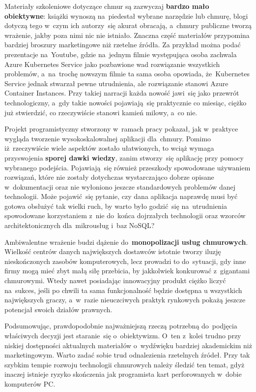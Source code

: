 \documentclass[12pt,a4paper,twoside,titlepage,openright]{book}
\begin{document}
Materiały szkoleniowe dotyczące chmur są zazwyczaj \textbf{bardzo mało obiektywne}: książki wynoszą na~piedestał wybrane narzędzie lub chmurę, blogi dotyczą tego w~czym ich autorzy~się akurat obracają, a~chmury publiczne tworzą wrażenie, jakby poza nimi nic nie istniało. Znaczna część materiałów przypomina bardziej broszury marketingowe niż rzetelne źródła. Za przykład można podać prezentacje na~Youtube, gdzie na~jednym filmie występująca osoba zachwala Azure Kubernetes Service jako pozbawione wad rozwiązanie wszystkich problemów, a~na~trochę nowszym filmie ta sama osoba opowiada, że~Kubernetes Service jednak stwarzał pewne utrudnienia, ale rozwiązanie stanowi Azure Container Instances. Przy takiej narracji każda nowość jawi~się jako przewrót technologiczny, a~gdy takie nowości pojawiają~się praktycznie co miesiąc, ciężko już stwierdzić, co rzeczywiście stanowi kamień milowy, a~co nie.

Projekt programistyczny stworzony w~ramach pracy pokazał, jak w~praktyce wygląda tworzenie wysokoskalowalnej aplikacji dla~chmury. Pomimo iż~rzeczywiście wiele aspektów zostało ułatwionych, to wciąż wymaga przyswojenia \textbf{sporej dawki wiedzy}, zanim stworzy~się aplikację przy pomocy wybranego podejścia. Pojawiają~się również przeszkody spowodowane używaniem rozwiązań, które nie zostały dotychczas wystarczająco dobrze opisane w~dokumentacji oraz nie wyłoniono jeszcze standardowych problemów danej technologii. Może pojawić~się pytanie, czy dana aplikacja naprawdę musi być gotowa obsłużyć tak wielki ruch, by warto było godzić~się na~utrudnienia spowodowane korzystaniem z~nie do~końca dojrzałych technologii oraz wzorców architektonicznych dla~mikrousług i~baz NoSQL? 

Ambiwalentne wrażenie budzi dążenie do~\textbf{monopolizacji usług chmurowych}. Wielkość centrów danych największych dostawców istotnie tworzy iluzję nieskończonych zasobów komputerowych, lecz prowadzi to do~sytuacji, gdy inne firmy mogą mieć zbyt małą siłę przebicia, by jakkolwiek konkurować z~gigantami chmurowymi. Wtedy nawet posiadając innowacyjny produkt ciężko liczyć na~sukces, jeśli po chwili ta sama funkcjonalność będzie dostępna u wszystkich największych graczy, a~w~razie nieuczciwych praktyk rynkowych pokażą jeszcze potencjał swoich działów prawnych.

Podsumowując, prawdopodobnie najważniejszą rzeczą potrzebną do~podjęcia właściwych decyzji jest staranie~się o~obiektywizm. O~ten z~kolei trudno przy niskiej dostępności aktualnych materiałów o~wydźwięku bardziej akademickim niż marketingowym. Warto zadać sobie trud odnalezienia rzetelnych źródeł. Przy tak szybkim tempie rozwoju technologii chmurowych należy śledzić ten temat, gdyż inaczej istnieje ryzyko skończenia jak programista kart perforowanych w~dobie komputerów PC. 





 
\listoffigures

\listoftables



\printbibliography
 
\end{document}

